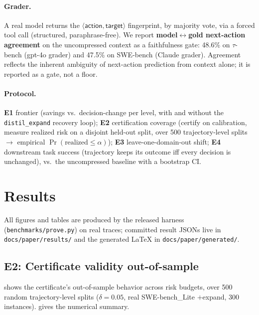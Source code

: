 \documentclass{article}
\begin{document}
\paragraph{Grader.} A real model returns the
$\langle\textsf{action},\textsf{target}\rangle$ fingerprint, by majority vote, via a
forced tool call (structured, paraphrase-free). We report \textbf{model$\leftrightarrow$gold
next-action agreement} on the uncompressed context as a faithfulness gate: 48.6\%
on $\tau$-bench (gpt-4o grader) and 47.5\% on SWE-bench (Claude grader). Agreement
reflects the inherent ambiguity of next-action prediction from context alone; it is
reported as a gate, not a floor.
\paragraph{Protocol.} \textbf{E1} frontier (savings vs.\ decision-change per level,
with and without the \texttt{distil\_expand} recovery loop); \textbf{E2}
certification coverage (certify on calibration, measure realized risk on a disjoint
held-out split, over 500 trajectory-level splits $\to$ empirical
$\Pr(\text{realized}\le\alpha)$); \textbf{E3} leave-one-domain-out shift; \textbf{E4}
downstream task success (trajectory keeps its outcome iff every decision is
unchanged), vs.\ the uncompressed baseline with a bootstrap CI.

\section{Results}
\label{sec:results}
{\sloppy
All figures and tables are produced by the released harness
(\texttt{benchmarks/prove.py}) on real traces; committed result JSONs live in
\texttt{docs/paper/results/} and the generated LaTeX in
\texttt{docs/paper/generated/}.\par}

\subsection{E2: Certificate validity out-of-sample}
\label{sec:e2}

 shows the certificate's out-of-sample behavior across
risk budgets, over 500 random trajectory-level splits ($\delta=0.05$, real
SWE-bench\_Lite $+$expand, 300 instances).  gives the numerical
summary.
\end{document}
